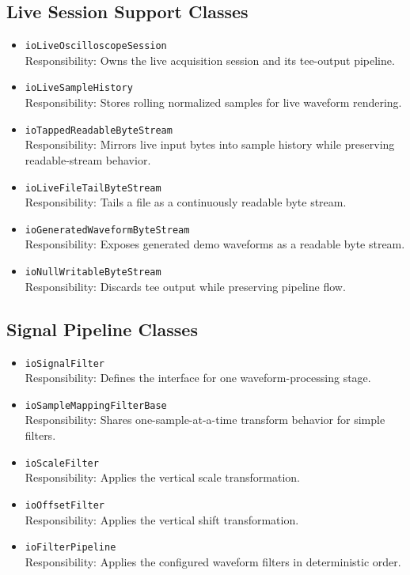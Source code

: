 \subsection{Live Session Support Classes}
\begin{itemize}
    \item \texttt{ioLiveOscilloscopeSession} \\
    Responsibility: Owns the live acquisition session and its tee-output pipeline.

    \item \texttt{ioLiveSampleHistory} \\
    Responsibility: Stores rolling normalized samples for live waveform rendering.

    \item \texttt{ioTappedReadableByteStream} \\
    Responsibility: Mirrors live input bytes into sample history while preserving readable-stream behavior.

    \item \texttt{ioLiveFileTailByteStream} \\
    Responsibility: Tails a file as a continuously readable byte stream.

    \item \texttt{ioGeneratedWaveformByteStream} \\
    Responsibility: Exposes generated demo waveforms as a readable byte stream.

    \item \texttt{ioNullWritableByteStream} \\
    Responsibility: Discards tee output while preserving pipeline flow.
\end{itemize}

\subsection{Signal Pipeline Classes}
\begin{itemize}
    \item \texttt{ioSignalFilter} \\
    Responsibility: Defines the interface for one waveform-processing stage.

    \item \texttt{ioSampleMappingFilterBase} \\
    Responsibility: Shares one-sample-at-a-time transform behavior for simple filters.

    \item \texttt{ioScaleFilter} \\
    Responsibility: Applies the vertical scale transformation.

    \item \texttt{ioOffsetFilter} \\
    Responsibility: Applies the vertical shift transformation.

    \item \texttt{ioFilterPipeline} \\
    Responsibility: Applies the configured waveform filters in deterministic order.
\end{itemize}

